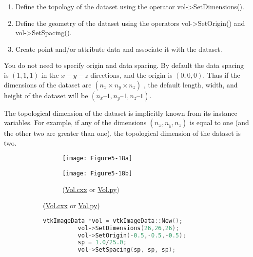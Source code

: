 \begin{description}[leftmargin=0cm,labelindent=0cm]
\begin{enumerate}

	\item Define the topology of the dataset using the operator vol->SetDimensions().

	\item Define the geometry of the dataset using the operators vol->SetOrigin() and vol->SetSpacing().

	\item Create point and/or attribute data and associate it with the dataset.

\end{enumerate}

You do not need to specify origin and data spacing. By default the data spacing is $(1,1,1)$ in the $x-y-z$ directions, and the origin is $(0,0,0)$. Thus if the dimensions of the dataset are $(n_x \times n_y \times n_z)$ , the default length, width, and height of the dataset will be $(n_x – 1, n_y – 1, n_z – 1)$.

The topological dimension of the dataset is implicitly known from its instance variables. For example, if any of the dimensions $(n_x, n_y, n_z)$ is equal to one (and the other two are greater than one), the topological dimension of the dataset is two.

\begin{figure}[!htb]
    \centering
    \begin{subfigure}[h]{0.86\linewidth}
    	\begin{subfigure}[h]{0.43\linewidth}
    		\texttt{[image: Figure5-18a]}
    		\caption*{}
    		\label{fig:Figure5-18a}
    	\end{subfigure}
    	\hfill
    	\begin{subfigure}[h]{0.43\linewidth}
    		\texttt{[image: Figure5-18b]}
    		\caption*{(\href{https://lorensen.github.io/VTKExamples/site/Cxx/StructuredPoints/Vol/}{Vol.cxx} or \href{https://lorensen.github.io/VTKExamples/site/Python/StructuredPoints/Vol/}{Vol.py})}
    		\label{fig:Figure5-18b}
    	\end{subfigure}
	\end{subfigure}
	\hfill
	\begin{subfigure}[h]{0.56\linewidth}
		\begin{lstlisting}[language=C++, caption={}]
		vtkImageData *vol = vtkImageData::New();
		  vol->SetDimensions(26,26,26);
		  vol->SetOrigin(-0.5,-0.5,-0.5);
		  sp = 1.0/25.0;
		  vol->SetSpacing(sp, sp, sp);


\end{lstlisting}
\end{subfigure}
\end{figure}
\end{description}
